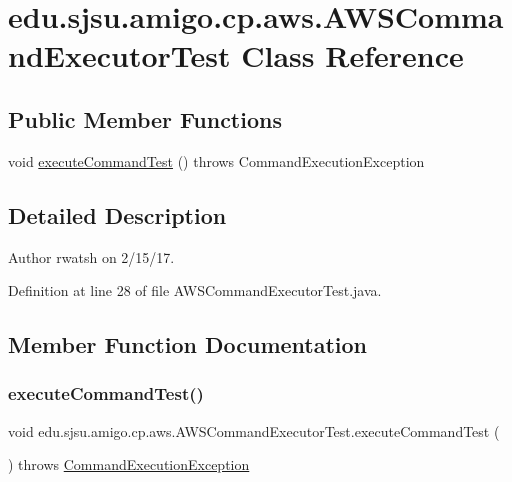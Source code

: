 \hypertarget{classedu_1_1sjsu_1_1amigo_1_1cp_1_1aws_1_1_a_w_s_command_executor_test}{}\section{edu.\+sjsu.\+amigo.\+cp.\+aws.\+A\+W\+S\+Command\+Executor\+Test Class Reference}
\label{classedu_1_1sjsu_1_1amigo_1_1cp_1_1aws_1_1_a_w_s_command_executor_test}
\subsection*{Public Member Functions}
\begin{DoxyCompactItemize}
\item 
void \hyperlink{classedu_1_1sjsu_1_1amigo_1_1cp_1_1aws_1_1_a_w_s_command_executor_test_a257592af8f37e8ca0c29b8f497edcc27}{execute\+Command\+Test} ()  throws Command\+Execution\+Exception 
\end{DoxyCompactItemize}


\subsection{Detailed Description}
\begin{DoxyAuthor}{Author}
rwatsh on 2/15/17. 
\end{DoxyAuthor}


Definition at line 28 of file A\+W\+S\+Command\+Executor\+Test.\+java.



\subsection{Member Function Documentation}
\mbox{\label{classedu_1_1sjsu_1_1amigo_1_1cp_1_1aws_1_1_a_w_s_command_executor_test_a257592af8f37e8ca0c29b8f497edcc27}} 
\subsubsection{\texorpdfstring{execute\+Command\+Test()}{executeCommandTest()}}
{\footnotesize\ttfamily void edu.\+sjsu.\+amigo.\+cp.\+aws.\+A\+W\+S\+Command\+Executor\+Test.\+execute\+Command\+Test (\begin{DoxyParamCaption}{ }\end{DoxyParamCaption}) throws \hyperlink{classedu_1_1sjsu_1_1amigo_1_1cp_1_1api_1_1_command_execution_exception}{Command\+Execution\+Exception}}




